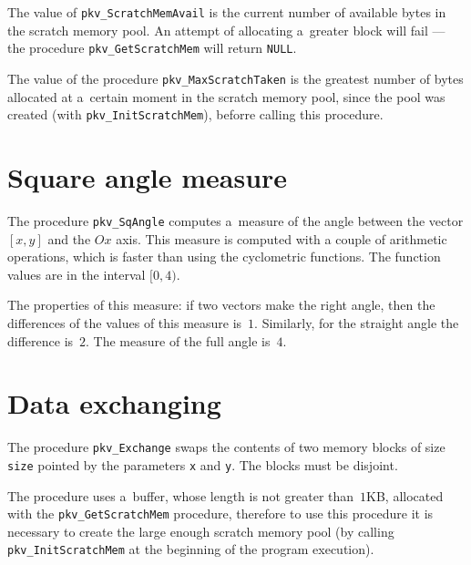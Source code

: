 \vspace{\bigskipamount}
The value of \texttt{pkv\_ScratchMemAvail} is the current number of available
bytes in the scratch memory pool. An attempt of allocating a~greater block
will fail --- the procedure \texttt{pkv\_GetScratchMem} will return
\texttt{NULL}.

\vspace{\bigskipamount}
The value of the procedure \texttt{pkv\_MaxScratchTaken} is the greatest number
of bytes allocated at a~certain moment in the scratch memory pool,
since the pool was created (with \texttt{pkv\_InitScratchMem}),
beforre calling this procedure.


\section{Square angle measure}

\mbox{}
\indent
The procedure \texttt{pkv\_SqAngle} computes a~measure of the angle between
the vector $[x,y]$ and the $Ox$ axis. This measure is computed with a couple
of arithmetic operations, which is faster than using the cyclometric
functions. The function values are in the interval $[0,4)$.

The properties of this measure: if two vectors make the right angle,
then the differences of the values of this measure is~$1$. Similarly,
for the straight angle the difference is~$2$. The measure of the full angle is~$4$.


\section{Data exchanging}

\hspace*{\parindent}
The procedure \texttt{pkv\_Exchange} swaps the contents of two memory
blocks of size \texttt{size} pointed by the parameters \texttt{x}
and \texttt{y}. The blocks must be disjoint.

\begin{sloppypar}
The procedure uses a~buffer, whose length is not greater than~$1$KB, allocated
with the \texttt{pkv\_GetScratchMem} procedure, therefore to use this
procedure it is necessary to create the large enough scratch memory pool
(by calling \texttt{pkv\_InitScratchMem} at the beginning of the program
execution).
\end{sloppypar}

